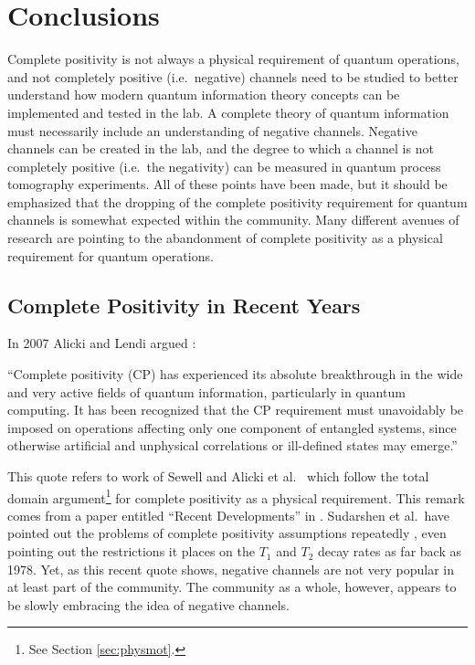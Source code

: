 \chapter{Conclusions}

Complete positivity is not always a  physical requirement of quantum operations, and not completely positive (i.e.\ negative) channels need to be studied to better understand how modern quantum information theory concepts can be implemented and tested in the lab.  A complete theory of quantum information must necessarily include an understanding of negative channels.  Negative channels can be created in the lab, and the degree to which a channel is not completely positive (i.e.\ the negativity) can be measured in quantum process tomography experiments.  All of these points have been made, but it should be emphasized that the dropping of the complete positivity requirement for quantum channels is somewhat expected within the community.  Many different avenues of research are pointing to the abandonment of complete positivity as a physical requirement for quantum operations.

\section{Complete Positivity in Recent Years}

In 2007 Alicki and Lendi argued \cite{Alicki2007}:

``Complete positivity (CP) has experienced its absolute breakthrough in the wide and very active fields of quantum information, particularly in quantum computing. It has been recognized that the CP requirement must unavoidably be imposed on operations affecting only one component of entangled systems, since otherwise artificial and unphysical correlations or ill-defined states may emerge.''

This quote refers to work of Sewell \cite{Sewell2002} and Alicki et al.\ \cite{Alicki2001} which follow the total domain argument\footnote{See Section \ref{sec:physmot}.} for complete positivity as a physical requirement.  This remark comes from a paper entitled ``Recent Developments'' in \cite{Alicki2007}.  Sudarshen et al.\ have pointed out the problems of complete positivity assumptions repeatedly \cite{Sudarshan2005} \cite{Rodriguez2008A} \cite{Sudarshan1978} \cite{Sudarshan1976}, even pointing out the restrictions it places on the $T_1$ and $T_2$ decay rates as far back as 1978.  Yet, as this recent quote shows, negative channels are not very popular in at least part of the community.  The community as a whole, however, appears to be slowly embracing the idea of negative channels.

